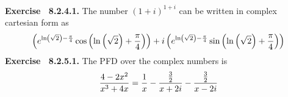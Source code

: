  {\noindent \protect \bf  Exercise ~8.2.4.1.} The number $(1+i)^{1+i}$ can be written in complex cartesian form as $$\left (e^{\protect \qopname  \relax o{ln}\left (\protect \sqrt  {2}\right )-\protect \frac  {\pi }{4}}\protect \qopname  \relax o{cos}\left (\protect \qopname  \relax o{ln}\left (\protect \sqrt  {2}\right )+\protect \frac  {\pi }{4} \right )\right )+i\left (e^{\protect \qopname  \relax o{ln}\left (\protect \sqrt  {2}\right )-\protect \frac  {\pi }{4}}\protect \qopname  \relax o{sin}\left (\protect \qopname  \relax o{ln}\left (\protect \sqrt  {2}\right )+\protect \frac  {\pi }{4} \right )\right ) $$ \protect \newline  \protect \newline  
 {\noindent \protect \bf  Exercise ~8.2.5.1.} The PFD over the complex numbers is $$\protect \frac  {4-2x^2}{x^3+4x}=\protect \frac  {1}{x}-\protect \frac  {\protect \frac  {3}{2}}{x+2i}-\protect \frac  {\protect \frac  {3}{2}}{x-2i} $$ \protect \newline  \protect \newline  
